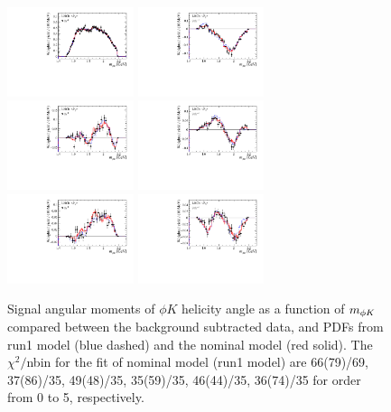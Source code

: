 \begin{figure}[!htbp]
\centering
\includegraphics[width=0.33\textwidth]{Figures/03_Zcs/app_moments/shykst0}%
\includegraphics[width=0.33\textwidth]{Figures/03_Zcs/app_moments/shykst1}%
\includegraphics[width=0.33\textwidth]{Figures/03_Zcs/app_moments/shykst2}
\includegraphics[width=0.33\textwidth]{Figures/03_Zcs/app_moments/shykst3}%
\includegraphics[width=0.33\textwidth]{Figures/03_Zcs/app_moments/shykst4}%
\includegraphics[width=0.33\textwidth]{Figures/03_Zcs/app_moments/shykst5}
\caption{Signal angular moments of $\phi K$ helicity angle as a function of $m_{\phi K}$ compared between the background subtracted data, and PDFs from run1 model (blue dashed) and the nominal model (red solid). The $\chi^2/$nbin for the fit of nominal model (run1 model) are 66(79)/69, 37(86)/35, 49(48)/35, 35(59)/35, 46(44)/35, 36(74)/35 for order from 0 to 5, respectively.}
\label{mom5kst}
\end{figure}

